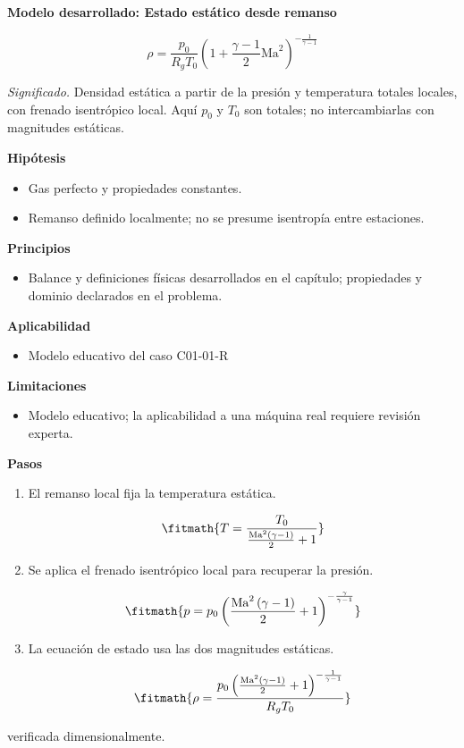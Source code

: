 \documentclass[10pt,openany]{book}
\begin{document}
\begin{tcolorbox}[title={Desarrollos del modelo}, studiumdef, breakable]

\noindent\textbf{Modelo desarrollado: Estado estático desde remanso}

\begin{equation}
\rho=\frac{p_0}{R_g T_0}\left(1+\frac{\gamma-1}{2}\mathrm{Ma}^2\right)^{-\frac{1}{\gamma-1}}
\label{eq:EC-C01}
\end{equation}

\noindent\textit{Significado.} Densidad estática a partir de la presión y temperatura totales locales, con frenado isentrópico local. Aquí $p_0$ y $T_0$ son totales; no intercambiarlas con magnitudes estáticas.

\noindent\textbf{Hipótesis}
\begin{itemize}
\item Gas perfecto y propiedades constantes.
\item Remanso definido localmente; no se presume isentropía entre estaciones.
\end{itemize}

\noindent\textbf{Principios}
\begin{itemize}
\item Balance y definiciones físicas desarrollados en el capítulo; propiedades y dominio declarados en el problema.
\end{itemize}

\noindent\textbf{Aplicabilidad}
\begin{itemize}
\item Modelo educativo del caso C01-01-R
\end{itemize}

\noindent\textbf{Limitaciones}
\begin{itemize}
\item Modelo educativo; la aplicabilidad a una máquina real requiere revisión experta.
\end{itemize}

\noindent\textbf{Pasos}
\begin{enumerate}
\item
El remanso local fija la temperatura estática.

\[
\fitmath{T=\frac{T_0}{\frac{\mathrm{Ma}^{2} \left(\gamma - 1\right)}{2} + 1}}
\]
\item
Se aplica el frenado isentrópico local para recuperar la presión.

\[
\fitmath{p=p_0 \left(\frac{\mathrm{Ma}^{2} \left(\gamma - 1\right)}{2} + 1\right)^{- \frac{\gamma}{\gamma - 1}}}
\]
\item
La ecuación de estado usa las dos magnitudes estáticas.

\[
\fitmath{\rho=\frac{p_0 \left(\frac{\mathrm{Ma}^{2} \left(\gamma - 1\right)}{2} + 1\right)^{- \frac{1}{\gamma - 1}}}{R_g T_0}}
\]
\end{enumerate}

{\noindent\footnotesize verificada dimensionalmente.\par}
\end{tcolorbox}
\end{document}
